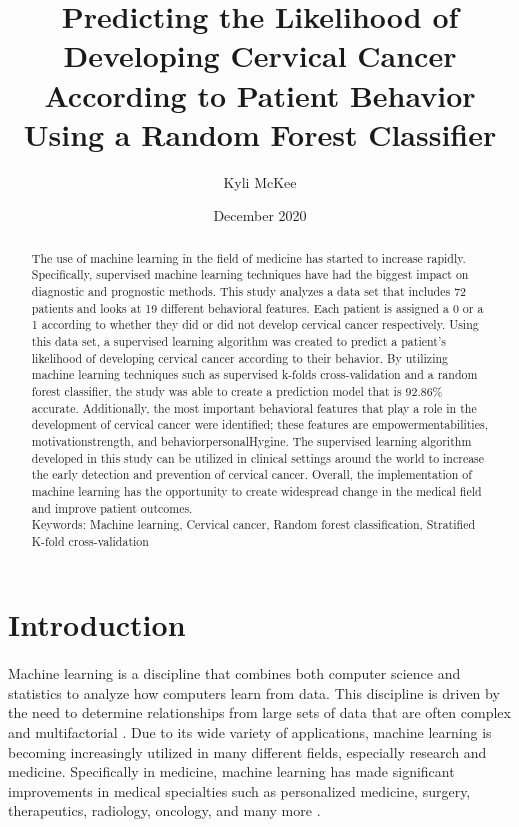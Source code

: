 \documentclass[10pt, oneside, twocolumn]{article}
\title{Predicting the Likelihood of Developing Cervical Cancer According to Patient Behavior Using a Random Forest Classifier}
\author{Kyli McKee}
\date{December 2020}
\begin{document}
\maketitle
\begin{abstract}
\paragraph{}
The use of machine learning in the field of medicine has started to increase rapidly. Specifically, supervised machine learning techniques have had the biggest impact on diagnostic and prognostic methods. This study analyzes a data set that includes 72 patients and looks at 19 different behavioral features. Each patient is assigned a 0 or a 1 according to whether they did or did not develop cervical cancer respectively. Using this data set, a supervised learning algorithm was created to predict a patient’s likelihood of developing cervical cancer according to their behavior. By utilizing machine learning techniques such as supervised k-folds cross-validation and a random forest classifier, the study was able to create a prediction model that is 92.86\% accurate. Additionally, the most important behavioral features that play a role in the development of cervical cancer were identified; these features are empowerment\textunderscore abilities, motivation\textunderscore strength, and behavior\textunderscore personalHygine. The supervised learning algorithm developed in this study can be utilized in clinical settings around the world to increase the early detection and prevention of cervical cancer. Overall, the implementation of machine  learning has the opportunity to create widespread change in the medical field and improve patient outcomes.\\
Keywords: Machine learning, Cervical cancer, Random forest classification, Stratified K-fold cross-validation
\end{abstract}

\section{Introduction}
\paragraph{}
Machine learning is a discipline that combines both computer science and statistics to analyze how computers learn from data.  This discipline is driven by the need to determine relationships from large sets of data that are often complex and multifactorial \cite{Deo}. Due to its wide variety of applications, machine learning is becoming increasingly utilized in many different fields, especially research and medicine. Specifically in medicine, machine learning has made significant improvements in medical specialties such as personalized medicine, surgery, therapeutics, radiology, oncology, and many more \cite{Handelman}.
\end{document}
